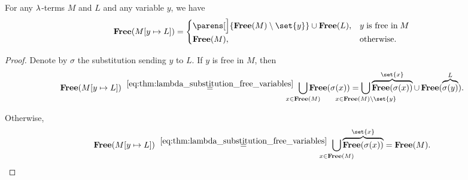 \begin{corollary}\label{thm:lambda_substitution_free_variables_single}
  For any \( \mathrm{\lambda} \)-terms \( M \) and \( L \) and any variable \( y \), we have
  \begin{equation}\label{eq:thm:lambda_substitution_free_variables_single}
    \op*{Free}( M[y \mapsto L] ) = \begin{cases}
      \parens[\Big]{ \op*{Free}(M) \setminus \set{ y } } \cup \op*{Free}(L), &y \T{is free in} M \\
      \op*{Free}(M),                                                         &\T{otherwise.}
    \end{cases}
  \end{equation}
\end{corollary}
\begin{proof}
  Denote by \( \sigma \) the substitution sending \( y \) to \( L \). If \( y \) is free in \( M \), then
  \begin{equation*}
    \op*{Free}(M[y \mapsto L])
    \reloset{\eqref{eq:thm:lambda_substitution_free_variables}} =
    \bigcup_{\mathclap{x \in \op*{Free}(M)}} \op*{Free}(\sigma(x))
    =
    \bigcup_{\mathclap{x \in \op*{Free}(M) \setminus \set{ y }}} \overbrace{\op*{Free}(\sigma(x))}^{\set{ x }} \cup \op*{Free}(\overbrace{\sigma(y)}^L).
  \end{equation*}

  Otherwise,
  \begin{equation*}
    \op*{Free}(M[y \mapsto L])
    \reloset{\eqref{eq:thm:lambda_substitution_free_variables}} =
    \bigcup_{\mathclap{x \in \op*{Free}(M)}} \overbrace{\op*{Free}(\sigma(x))}^{\set{ x }}
    =
    \op*{Free}(M).
  \end{equation*}
\end{proof}

